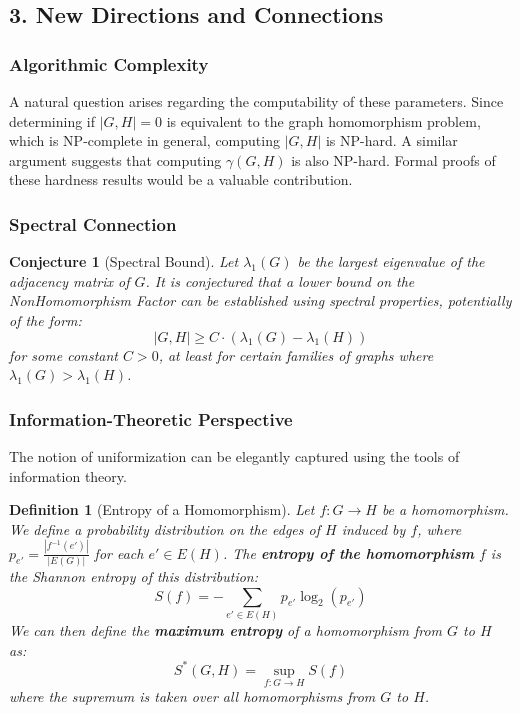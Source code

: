 \documentclass[11pt]{article}
\newtheorem{conjecture}[theorem]{Conjecture}
\newtheorem{definition}[theorem]{Definition}
\begin{document}
\subsection*{3. New Directions and Connections}

\subsubsection*{Algorithmic Complexity}
A natural question arises regarding the computability of these parameters. Since determining if $|G,H|=0$ is equivalent to the graph homomorphism problem, which is NP-complete in general, computing $|G,H|$ is NP-hard. A similar argument suggests that computing $\gamma(G,H)$ is also NP-hard. Formal proofs of these hardness results would be a valuable contribution.

\subsubsection*{Spectral Connection}
\begin{conjecture}[Spectral Bound]
Let $\lambda_1(G)$ be the largest eigenvalue of the adjacency matrix of $G$. It is conjectured that a lower bound on the NonHomomorphism Factor can be established using spectral properties, potentially of the form:
$$|G,H| \ge C \cdot (\lambda_1(G) - \lambda_1(H))$$
for some constant $C>0$, at least for certain families of graphs where $\lambda_1(G) > \lambda_1(H)$.
\end{conjecture}

\subsubsection*{Information-Theoretic Perspective}
The notion of uniformization can be elegantly captured using the tools of information theory.

\begin{definition}[Entropy of a Homomorphism]
Let $f: G \to H$ be a homomorphism. We define a probability distribution on the edges of $H$ induced by $f$, where $p_{e'} = \frac{|f^{-1}(e')|}{|E(G)|}$ for each $e' \in E(H)$. The \textbf{entropy of the homomorphism} $f$ is the Shannon entropy of this distribution:
$$S(f) = - \sum_{e' \in E(H)} p_{e'} \log_2(p_{e'})$$
We can then define the \textbf{maximum entropy} of a homomorphism from $G$ to $H$ as:
$$S^*(G,H) = \sup_{f: G \to H} S(f)$$
where the supremum is taken over all homomorphisms from $G$ to $H$.
\end{definition}
\end{document}
